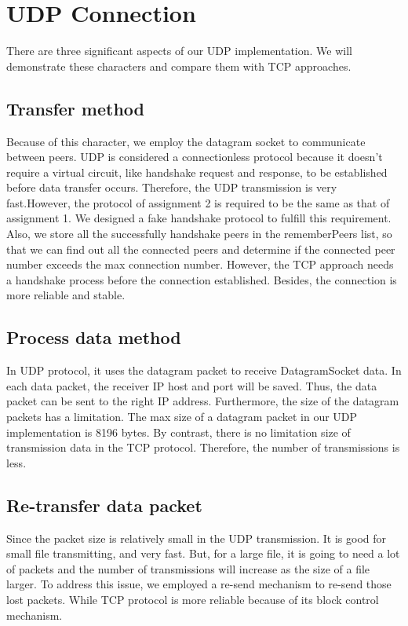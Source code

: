 \documentclass[a4paper,10pt,titlepage,twocolumn]{article}
\begin{document}
    \section{UDP Connection}
    There are three significant aspects of our UDP implementation. We will demonstrate these characters and compare them with TCP approaches. 
    \subsection{Transfer method}
    Because of this character, we employ the datagram socket to communicate between peers. UDP is considered a connectionless protocol because it doesn't require a virtual circuit, like handshake request and response, to be established before data transfer occurs. Therefore, the UDP transmission is very fast.However, the protocol of assignment 2 is required to be the same as that of assignment 1. We designed a fake handshake protocol to fulfill this requirement. Also, we store all the successfully handshake peers in the rememberPeers list, so that we can find out all the connected peers and determine if the connected peer number exceeds the max connection number. However, the TCP approach needs a handshake process before the connection established. Besides, the connection is more reliable and stable.
    \subsection{Process data method}    
    In UDP protocol, it uses the datagram packet to receive DatagramSocket data. In each data packet, the receiver IP host and port will be saved. Thus, the data packet can be sent to the right IP address. Furthermore, the size of the datagram packets has a limitation. The max size of a datagram packet in our UDP implementation is 8196 bytes. By contrast, there is no limitation size of transmission data in the TCP protocol. Therefore, the number of transmissions is less.
    \subsection{Re-transfer data packet}    
    Since the packet size is relatively small in the UDP transmission. It is good for small file transmitting, and very fast. But, for a large file, it is going to need a lot of packets and the number of transmissions will increase as the size of a file larger. To address this issue, we employed a re-send mechanism to re-send those lost packets. While TCP protocol is more reliable because of its block control mechanism.
\end{document}
